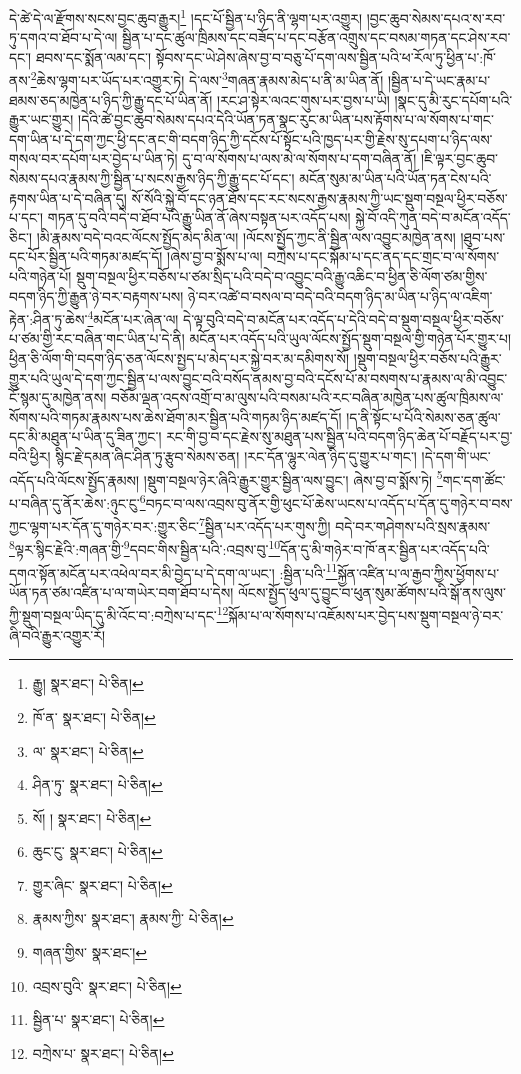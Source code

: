 དེ་ཚེ་དེ་ལ་རྫོགས་སངས་བྱང་ཆུབ་རྒྱུར།\footnote{རྒྱུ།  སྣར་ཐང་།  པེ་ཅིན། } །དང་པོ་སྦྱིན་པ་ཉིད་ནི་ལྷག་པར་འགྱུར། །བྱང་ཆུབ་སེམས་དཔའ་ས་རབ་ཏུ་དགའ་བ་ཐོབ་པ་དེ་ལ། སྦྱིན་པ་དང་ཚུལ་ཁྲིམས་དང་བཟོད་པ་དང་བརྩོན་འགྲུས་དང་བསམ་གཏན་དང་ཤེས་རབ་དང་། ཐབས་དང་སྨོན་ལམ་དང་། སྟོབས་དང་ཡེ་ཤེས་ཞེས་བྱ་བ་བཅུ་པོ་དག་ལས་སྦྱིན་པའི་ཕ་རོལ་ཏུ་ཕྱིན་པ་:ཁོ་ནས་\footnote{ཁོ་ན་  སྣར་ཐང་།  པེ་ཅིན། }ཆེས་ལྷག་པར་ཡོད་པར་འགྱུར་ཏེ། དེ་ལས་\footnote{ལ་  སྣར་ཐང་།  པེ་ཅིན། }གཞན་རྣམས་མེད་པ་ནི་མ་ཡིན་ནོ། །སྦྱིན་པ་དེ་ཡང་རྣམ་པ་ཐམས་ཅད་མཁྱེན་པ་ཉིད་ཀྱི་རྒྱུ་དང་པོ་ཡིན་ནོ། །རང་ཤ་སྟེར་ལའང་གུས་པར་བྱས་པ་ཡི། །སྣང་དུ་མི་རུང་དཔོག་པའི་རྒྱུར་ཡང་གྱུར། །དེའི་ཚེ་བྱང་ཆུབ་སེམས་དཔའ་དེའི་ཡོན་ཏན་སྣང་རུང་མ་ཡིན་པས་རྟོགས་པ་ལ་སོགས་པ་གང་དག་ཡིན་པ་དེ་དག་ཀྱང་ཕྱི་དང་ནང་གི་བདག་ཉིད་ཀྱི་དངོས་པོ་སྟོང་པའི་ཁྱད་པར་གྱི་རྗེས་སུ་དཔག་པ་ཉིད་ལས་གསལ་བར་དཔོག་པར་བྱེད་པ་ཡིན་ཏེ། དུ་བ་ལ་སོགས་པ་ལས་མེ་ལ་སོགས་པ་དག་བཞིན་ནོ། །ཇི་ལྟར་བྱང་ཆུབ་སེམས་དཔའ་རྣམས་ཀྱི་སྦྱིན་པ་སངས་རྒྱས་ཉིད་ཀྱི་རྒྱུ་དང་པོ་དང་། མངོན་སུམ་མ་ཡིན་པའི་ཡོན་ཏན་ངེས་པའི་རྟགས་ཡིན་པ་དེ་བཞིན་དུ། སོ་སོའི་སྐྱེ་བོ་དང་ཉན་ཐོས་དང་རང་སངས་རྒྱས་རྣམས་ཀྱི་ཡང་སྡུག་བསྔལ་ཕྱིར་བཅོས་པ་དང་། གཏན་དུ་བའི་བདེ་བ་ཐོབ་པའི་རྒྱུ་ཡིན་ནོ་ཞེས་བསྟན་པར་འདོད་པས། སྐྱེ་བོ་འདི་ཀུན་བདེ་བ་མངོན་འདོད་ཅིང་། །མི་རྣམས་བདེ་བའང་ལོངས་སྤྱོད་མེད་མིན་ལ། །ལོངས་སྤྱོད་ཀྱང་ནི་སྦྱིན་ལས་འབྱུང་མཁྱེན་ནས། །ཐུབ་པས་དང་པོར་སྦྱིན་པའི་གཏམ་མཛད་དོ། །ཞེས་བྱ་བ་སྨོས་པ་ལ། བཀྲེས་པ་དང་སྐོམ་པ་དང་ནད་དང་གྲང་བ་ལ་སོགས་པའི་གཉེན་པོ། སྡུག་བསྔལ་ཕྱིར་བཅོས་པ་ཙམ་སྲིད་པའི་བདེ་བ་འབྱུང་བའི་རྒྱུ་འཆིང་བ་ཕྱིན་ཅི་ལོག་ཙམ་གྱིས་བདག་ཉིད་ཀྱི་རྒྱུན་ཉེ་བར་བརྟགས་པས། ཉེ་བར་འཚེ་བ་བསལ་བ་བདེ་བའི་བདག་ཉིད་མ་ཡིན་པ་ཉིད་ལ་འཇིག་རྟེན་:ཤིན་ཏུ་ཆེས་\footnote{ཤིན་ཏུ་  སྣར་ཐང་།  པེ་ཅིན། }མངོན་པར་ཞེན་ལ། དེ་ལྟ་བུའི་བདེ་བ་མངོན་པར་འདོད་པ་དེའི་བདེ་བ་སྡུག་བསྔལ་ཕྱིར་བཅོས་པ་ཙམ་གྱི་རང་བཞིན་གང་ཡིན་པ་དེ་ནི། མངོན་པར་འདོད་པའི་ཡུལ་ལོངས་སྤྱོད་སྡུག་བསྔལ་གྱི་གཉེན་པོར་གྱུར་པ། ཕྱིན་ཅི་ལོག་གི་བདག་ཉིད་ཅན་ལོངས་སྤྱད་པ་མེད་པར་སྐྱེ་བར་མ་དམིགས་སོ། །སྡུག་བསྔལ་ཕྱིར་བཅོས་པའི་རྒྱུར་གྱུར་པའི་ཡུལ་དེ་དག་ཀྱང་སྦྱིན་པ་ལས་བྱུང་བའི་བསོད་ནམས་བྱ་བའི་དངོས་པོ་མ་བསགས་པ་རྣམས་ལ་མི་འབྱུང་ངོ་སྙམ་དུ་མཁྱེན་ནས། བཅོམ་ལྡན་འདས་འགྲོ་བ་མ་ལུས་པའི་བསམ་པའི་རང་བཞིན་མཁྱེན་པས་ཚུལ་ཁྲིམས་ལ་སོགས་པའི་གཏམ་རྣམས་པས་ཆེས་ཐོག་མར་སྦྱིན་པའི་གཏམ་ཉིད་མཛད་དོ། །ད་ནི་སྟོང་པ་པོའི་སེམས་ཅན་ཚུལ་དང་མི་མཐུན་པ་ཡིན་དུ་ཟིན་ཀྱང་། རང་གི་བྱ་བ་དང་རྗེས་སུ་མཐུན་པས་སྦྱིན་པའི་བདག་ཉིད་ཆེན་པོ་བརྗོད་པར་བྱ་བའི་ཕྱིར། སྙིང་རྗེ་དམན་ཞིང་ཤིན་ཏུ་རྩུབ་སེམས་ཅན། །རང་དོན་ལྷུར་ལེན་ཉིད་དུ་གྱུར་པ་གང་། །དེ་དག་གི་ཡང་འདོད་པའི་ལོངས་སྤྱོད་རྣམས། །སྡུག་བསྔལ་ཉེར་ཞིའི་རྒྱུར་གྱུར་སྦྱིན་ལས་བྱུང་། ཞེས་བྱ་བ་སྨོས་ཏེ། \footnote{སོ། །   སྣར་ཐང་།  པེ་ཅིན། }གང་དག་ཚོང་པ་བཞིན་དུ་ནོར་ཆེས་:ཉུང་ངུ་\footnote{ཆུང་ངུ་  སྣར་ཐང་།  པེ་ཅིན། }བཏང་བ་ལས་འབྲས་བུ་ནོར་གྱི་ཕུང་པོ་ཆེས་ཡངས་པ་འདོད་པ་དོན་དུ་གཉེར་བ་བས་ཀྱང་ལྷག་པར་དོན་དུ་གཉེར་བར་:གྱུར་ཅིང་\footnote{གྱུར་ཞིང་  སྣར་ཐང་།  པེ་ཅིན། }སྦྱིན་པར་འདོད་པར་གུས་ཀྱི། བདེ་བར་གཤེགས་པའི་སྲས་རྣམས་\footnote{རྣམས་ཀྱིས་  སྣར་ཐང་། རྣམས་ཀྱི་  པེ་ཅིན། }ལྟར་སྙིང་རྗེའི་:གཞན་གྱི་\footnote{གཞན་གྱིས་  སྣར་ཐང་། }དབང་གིས་སྦྱིན་པའི་:འབྲས་བུ་\footnote{འབྲས་བུའི་  སྣར་ཐང་།  པེ་ཅིན། }དོན་དུ་མི་གཉེར་བ་ཁོ་ནར་སྦྱིན་པར་འདོད་པའི་དགའ་སྟོན་མངོན་པར་འཕེལ་བར་མི་བྱེད་པ་དེ་དག་ལ་ཡང་། :སྦྱིན་པའི་\footnote{སྦྱིན་པ་  སྣར་ཐང་།  པེ་ཅིན། }སྐྱོན་འཛིན་པ་ལ་རྒྱབ་ཀྱིས་ཕྱོགས་པ་ཡོན་ཏན་ཙམ་འཛིན་པ་ལ་གཡེར་བག་ཐོབ་པ་དེས། ལོངས་སྤྱོད་ཕུལ་དུ་བྱུང་བ་ཕུན་སུམ་ཚོགས་པའི་སྒོ་ནས་ལུས་ཀྱི་སྡུག་བསྔལ་ཡིད་དུ་མི་འོང་བ་:བཀྲེས་པ་དང་\footnote{བཀྲེས་པ་  སྣར་ཐང་།  པེ་ཅིན། }སྐོམ་པ་ལ་སོགས་པ་འཇོམས་པར་བྱེད་པས་སྡུག་བསྔལ་ཉེ་བར་ཞི་བའི་རྒྱུར་འགྱུར་རོ། 